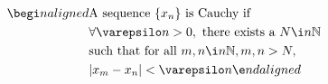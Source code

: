 \documentclass[preview]{standalone}
\begin{document}
\begin{align*}
\begi n {alig n ed}&\text{A  sequence  } \{ x_n \} \text{ is Cauchy if } \\ &\forall \varepsilo n  > 0, \text{ there exists a }  N  \i n   \mathbb{N}  \\ &\text{such that for all }  m ,  n  \i n   \mathbb{N} ,  m ,  n  >  N , \\ & |x_m - x_n|  < \varepsilo n \e n d{alig n ed}
\end{align*}
\end{document}
